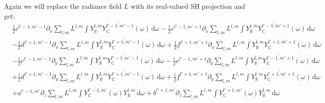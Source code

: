 \documentclass{egpubl}
\newcommand{\ud}{\,\mathrm{d}} %
\newcommand{\SHBR}{Y_{\mathbb{R}}} %
\begin{document}
Again we will replace the radiance field $L$ with its real-valued SH projection and get:
\begin{align*}
&
\frac{1}{2}c^{{l'-1,m'-1}}\partial_x\sum_{l,m}L^{l,m}\int{\SHBR^{l,m}\overline{Y_{\mathbb{C}}^{l'-1, m'-1}}(\omega )\ud\omega}
-\frac{1}{2}e^{{l'-1,m'+1}}\partial_x\sum_{l,m}L^{l,m}\int{\SHBR^{l,m}\overline{Y_{\mathbb{C}}^{l'-1, m'+1}}(\omega )\ud\omega}
\\&
-\frac{1}{2}d^{{l'+1,m'-1}}\partial_x\sum_{l,m}L^{l,m}\int{\SHBR^{l,m}\overline{Y_{\mathbb{C}}^{l'+1, m'-1}}(\omega )\ud\omega}
+\frac{1}{2}f^{{l'+1,m'+1}}\partial_x\sum_{l,m}L^{l,m}\int{\SHBR^{l,m}\overline{Y_{\mathbb{C}}^{l'+1, m'+1}}(\omega )\ud\omega}
\\&
-\frac{i}{2}c^{{l'-1,m'-1}}\partial_y\sum_{l,m}L^{l,m}\int{\SHBR^{l,m}\overline{Y_{\mathbb{C}}^{l'-1, m'-1}}(\omega )\ud\omega}
-\frac{i}{2}e^{{l'-1,m'+1}}\partial_y\sum_{l,m}L^{l,m}\int{\SHBR^{l,m}\overline{Y_{\mathbb{C}}^{l'-1, m'+1}}(\omega )\ud\omega}
\\&
+\frac{i}{2}d^{{l'+1,m'-1}}\partial_y\sum_{l,m}L^{l,m}\int{\SHBR^{l,m}\overline{Y_{\mathbb{C}}^{l'+1, m'-1}}(\omega )\ud\omega}
+\frac{i}{2}f^{{l'+1,m'+1}}\partial_y\sum_{l,m}L^{l,m}\int{\SHBR^{l,m}\overline{Y_{\mathbb{C}}^{l'+1, m'+1}}(\omega )\ud\omega}
\\&
+a^{{l'-1,m'}}\partial_z\sum_{l,m}L^{l,m}\int{\overline{Y_{\mathbb{C}}^{l'-1, m'}}(\omega )\SHBR^{l,m}\ud\omega}
+b^{{l'+1,m'}}\partial_z\sum_{l,m}L^{l,m}\int{\overline{Y_{\mathbb{C}}^{l'+1, m'}}(\omega )\SHBR^{l,m}\ud\omega}
\end{align*}
\end{document}
